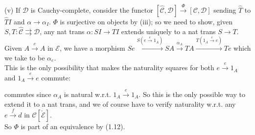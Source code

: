 \documentclass[a4paper]{article}
\begin{document}
(v) If $\mathcal{D}$ is Cauchy-complete, consider the functor $[\hat{\mathcal{C}},\mathcal{D}] \xrightarrow{\Phi} [\mathcal{C},\mathcal{D}]$ sending $\hat{T}$ to $\hat{T}I$ and $\alpha \to \alpha_I$. $\Phi$ is surjective on objects by (iii); so we need to show, given $S,T : \hat{\mathcal{C}} \rightrightarrows \mathcal{D}$, any nat trans $\alpha:SI \to TI$ extends uniquely to a nat trans $S \to T$. Given $A \xrightarrow{e} A$ in $\mathcal{E}$, we have a morphism $Se \xrightarrow{S(e \xrightarrow{e} 1_A)} SA \xrightarrow{\alpha_A} TA \xrightarrow{T(1_A \xrightarrow{e} e)} Te$ which we take to be $\alpha_e$.\\
This is the only possibility that makes the naturality squares for both $e \xrightarrow{e} 1_A$ and $1_A \xrightarrow{e} e$ commute:
commutes since $\alpha_A$ is natural w.r.t. $1_A \xrightarrow{e} 1_A$. So this is the only possible way to extend it to a nat trans, and we of course have to verify naturality w.r.t. any $e \xrightarrow{f} d$ in $\mathcal{C}[\check{\mathcal{E}}]$.\\
So $\Phi$ is part of an equivalence by (1.12).
\end{document}
